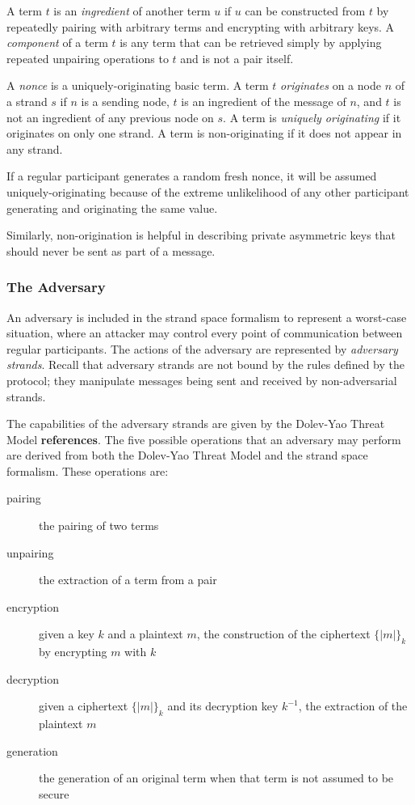 			A term $t$ is an \emph{ingredient} of another term $u$ if $u$ can
			be constructed from $t$ by repeatedly pairing with arbitrary terms
			and encrypting with arbitrary keys. A \emph{component} of a term
			$t$ is any term that can be retrieved simply by applying repeated
			unpairing operations to $t$ and is not a pair itself.

			A \emph{nonce} is a uniquely-originating basic term. A term $t$
			\emph{originates} on a node $n$ of a strand $s$ if $n$ is a
			sending node, $t$ is an ingredient of the message of $n$, and
			$t$ is not an ingredient of any previous node on $s$. A term is
			\emph{uniquely originating} if it originates on only one
			strand. A term is non-originating if it does not appear in any
			strand.

			If a regular participant generates a random fresh nonce, it
			will be assumed uniquely-originating because of the extreme
			unlikelihood of any other participant generating and
			originating the same value.

			Similarly, non-origination is helpful in describing private
			asymmetric keys that should never be sent as part of a message.

		\subsubsection{The Adversary}

			An adversary is included in the strand space formalism to
			represent a worst-case situation, where an attacker may control
			every point of communication between regular participants. The
			actions of the adversary are represented by \emph{adversary
			strands}. Recall that adversary strands are not bound by the
			rules defined by the protocol; they manipulate messages being
			sent and received by non-adversarial strands.

			The capabilities of the adversary strands are given by the
			Dolev-Yao Threat Model \textbf{references}. The five possible
			operations that an adversary may perform are derived from both
			the Dolev-Yao Threat Model and the strand space formalism.
			These operations are:

			\begin{description}
			\item [pairing] the pairing of two terms
			\item [unpairing] the extraction of a term from a pair
			\item [encryption] given a key $k$ and a plaintext $m$, the construction of the ciphertext $\{|m|\}_k$ by encrypting $m$ with $k$
			\item [decryption] given a ciphertext $\{|m|\}_k$ and its decryption key $k^{-1}$, the extraction of the plaintext $m$
			\item [generation] the generation of an original term when that term is not assumed to be secure
			\end{description}

